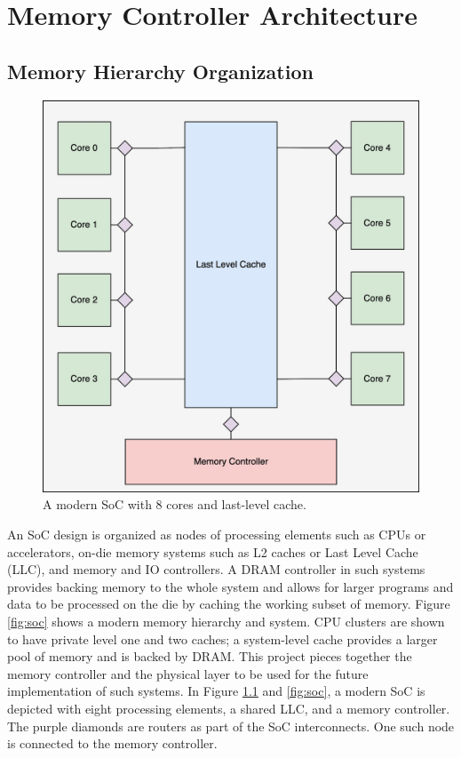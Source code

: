 \chapter{Memory Controller Architecture}
\label{chap:arch}
\section{Memory Hierarchy Organization}
\begin{figure}
    \centering
    \includegraphics[scale=0.15]{images/soc-2.jpg}
    \caption{A modern SoC with 8 cores and last-level cache.}
    \label{fig:soc-2}
\end{figure}
An SoC design is organized as nodes of processing elements such as CPUs or accelerators, on-die memory systems such as L2 caches or Last Level Cache (LLC), and memory and IO controllers. A DRAM controller in such systems provides backing memory to the whole system and allows for larger programs and data to be processed on the die by caching the working subset of memory. Figure \ref{fig:soc} shows a modern memory hierarchy and system. CPU clusters are shown to have private level one and two caches; a system-level cache provides a larger pool of memory and is backed by DRAM. This project pieces together the memory controller and the physical layer to be used for the future implementation of such systems. In Figure \ref{fig:soc-2} and \ref{fig:soc}, a modern SoC is depicted with eight processing elements, a shared LLC, and a memory controller. The purple diamonds are routers as part of the SoC interconnects. One such node is connected to the memory controller. 

